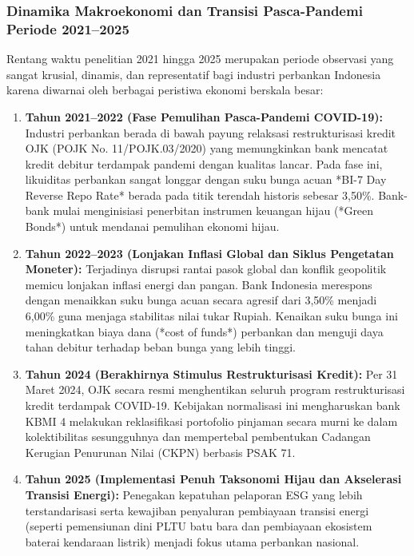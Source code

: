 \documentclass[12pt,a4paper]{article}
\numberwithin{equation}{section}
\begin{document}
\subsubsection*{Dinamika Makroekonomi dan Transisi Pasca-Pandemi Periode 2021--2025}
\noindent
Rentang waktu penelitian 2021 hingga 2025 merupakan periode observasi yang sangat krusial, dinamis, dan representatif bagi industri perbankan Indonesia karena diwarnai oleh berbagai peristiwa ekonomi berskala besar:
\begin{enumerate}
  \item \textbf{Tahun 2021--2022 (Fase Pemulihan Pasca-Pandemi COVID-19):} Industri perbankan berada di bawah payung relaksasi restrukturisasi kredit OJK (POJK No. 11/POJK.03/2020) yang memungkinkan bank mencatat kredit debitur terdampak pandemi dengan kualitas lancar. Pada fase ini, likuiditas perbankan sangat longgar dengan suku bunga acuan *BI-7 Day Reverse Repo Rate* berada pada titik terendah historis sebesar 3,50\%. Bank-bank mulai menginisiasi penerbitan instrumen keuangan hijau (*Green Bonds*) untuk mendanai pemulihan ekonomi hijau.
  \item \textbf{Tahun 2022--2023 (Lonjakan Inflasi Global dan Siklus Pengetatan Moneter):} Terjadinya disrupsi rantai pasok global dan konflik geopolitik memicu lonjakan inflasi energi dan pangan. Bank Indonesia merespons dengan menaikkan suku bunga acuan secara agresif dari 3,50\% menjadi 6,00\% guna menjaga stabilitas nilai tukar Rupiah. Kenaikan suku bunga ini meningkatkan biaya dana (*cost of funds*) perbankan dan menguji daya tahan debitur terhadap beban bunga yang lebih tinggi.
  \item \textbf{Tahun 2024 (Berakhirnya Stimulus Restrukturisasi Kredit):} Per 31 Maret 2024, OJK secara resmi menghentikan seluruh program restrukturisasi kredit terdampak COVID-19. Kebijakan normalisasi ini mengharuskan bank KBMI 4 melakukan reklasifikasi portofolio pinjaman secara murni ke dalam kolektibilitas sesungguhnya dan mempertebal pembentukan Cadangan Kerugian Penurunan Nilai (CKPN) berbasis PSAK 71.
  \item \textbf{Tahun 2025 (Implementasi Penuh Taksonomi Hijau dan Akselerasi Transisi Energi):} Penegakan kepatuhan pelaporan ESG yang lebih terstandarisasi serta kewajiban penyaluran pembiayaan transisi energi (seperti pemensiunan dini PLTU batu bara dan pembiayaan ekosistem baterai kendaraan listrik) menjadi fokus utama perbankan nasional.
\end{enumerate}
\end{document}
